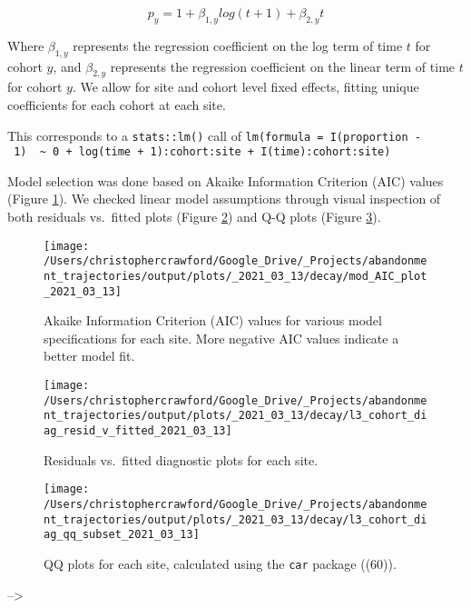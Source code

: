 \documentclass[9pt,twocolumn,twoside,]{pnas-new}
\begin{document}
\begin{equation}
p_{y} = 1 + \beta_{1,y} log(t + 1) + \beta_{2,y} t \label{eq:mod-spec-SI}
\end{equation}

Where \(\beta_{1,y}\) represents the regression coefficient on the log term of time \(t\) for cohort \(y\), and \(\beta_{2,y}\) represents the regression coefficient on the linear term of time \(t\) for cohort \(y\).
We allow for site and cohort level fixed effects, fitting unique coefficients for each cohort at each site.

This corresponds to a \texttt{stats::lm()} call of \texttt{lm(formula\ =\ I(proportion\ -\ 1)\ \ \textasciitilde{}\ 0\ +\ log(time\ +\ 1):cohort:site\ +\ I(time):cohort:site)}

Model selection was done based on Akaike Information Criterion (AIC) values (Figure \ref{fig:AIC}).
We checked linear model assumptions through visual inspection of both residuals vs.~fitted plots (Figure \ref{fig:diag-resid-fitted}) and Q-Q plots (Figure \ref{fig:diag-qq}).



\begin{figure}
\texttt{[image: /Users/christophercrawford/Google\_Drive/\_Projects/abandonment\_trajectories/output/plots/\_2021\_03\_13/decay/mod\_AIC\_plot\_2021\_03\_13]} \caption{Akaike Information Criterion (AIC) values for various model specifications for each site. More negative AIC values indicate a better model fit.}\label{fig:AIC}
\end{figure}



\begin{figure}
\texttt{[image: /Users/christophercrawford/Google\_Drive/\_Projects/abandonment\_trajectories/output/plots/\_2021\_03\_13/decay/l3\_cohort\_diag\_resid\_v\_fitted\_2021\_03\_13]} \caption{Residuals vs.~fitted diagnostic plots for each site.}\label{fig:diag-resid-fitted}
\end{figure}



\begin{figure}
\texttt{[image: /Users/christophercrawford/Google\_Drive/\_Projects/abandonment\_trajectories/output/plots/\_2021\_03\_13/decay/l3\_cohort\_diag\_qq\_subset\_2021\_03\_13]} \caption{QQ plots for each site, calculated using the \texttt{car} package ((60)).}\label{fig:diag-qq}
\end{figure}

--\textgreater{}
\end{document}
